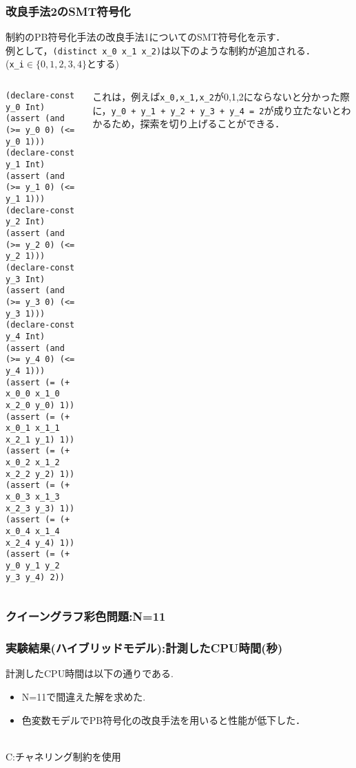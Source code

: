 \begin{frame}[fragile]\footnotesize
    \frametitle{改良手法2のSMT符号化}
    \distinct 制約のPB符号化手法の改良手法1についてのSMT符号化を示す．\\
    例として，\verb|(distinct x_0 x_1 x_2)|は以下のような制約が追加される．\\
    (\verb|x_i|$\in \{0,1,2,3,4\}$とする)

    \begin{columns}
        \begin{column}{0.5\textwidth}
            \begin{exampleblock}{}\scriptsize
\begin{verbatim}
(declare-const y_0 Int)
(assert (and (>= y_0 0) (<= y_0 1)))
(declare-const y_1 Int)
(assert (and (>= y_1 0) (<= y_1 1)))
(declare-const y_2 Int)
(assert (and (>= y_2 0) (<= y_2 1)))
(declare-const y_3 Int)
(assert (and (>= y_3 0) (<= y_3 1)))
(declare-const y_4 Int)
(assert (and (>= y_4 0) (<= y_4 1)))
(assert (= (+ x_0_0 x_1_0 x_2_0 y_0) 1))
(assert (= (+ x_0_1 x_1_1 x_2_1 y_1) 1))
(assert (= (+ x_0_2 x_1_2 x_2_2 y_2) 1))
(assert (= (+ x_0_3 x_1_3 x_2_3 y_3) 1))
(assert (= (+ x_0_4 x_1_4 x_2_4 y_4) 1))
(assert (= (+ y_0 y_1 y_2 y_3 y_4) 2))
\end{verbatim}
            \end{exampleblock}
        \end{column}
        \begin{column}{0.5\textwidth}\scriptsize
            これは，例えば\verb|x_0,x_1,x_2|が0,1,2にならないと分かった際に，\verb|y_0 + y_1 + y_2 + y_3 + y_4 = 2|が成り立たないとわかるため，探索を切り上げることができる．
        \end{column}
    \end{columns}

\end{frame}

\begin{frame}
    \frametitle{クイーングラフ彩色問題:N=11}
    
\end{frame}


\begin{frame}
    \frametitle{実験結果(ハイブリッドモデル):計測したCPU時間(秒)}
    計測したCPU時間は以下の通りである.
    \begin{block}{}
        {\tiny  }
    \end{block}
    \begin{itemize}
        \item N=11で間違えた解を求めた.
        \item 色変数モデルでPB符号化の改良手法を用いると性能が低下した．
    \end{itemize}
    \\
    \vspace{-3mm}
    {\tiny C:チャネリング制約を使用}\\
\end{frame}





\backupend

